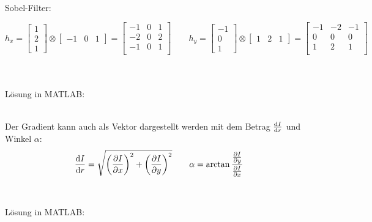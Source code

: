 ~\\
Sobel-Filter:
\begin{scriptsize}\[
	h_x = \left[\begin{matrix} 1 \\ 2 \\ 1\end{matrix}\right] 
	\otimes \left[\begin{matrix} -1 & 0 & 1	\end{matrix}\right] =
	\left[\begin{matrix}
			-1 & 0 & 1\\
			-2 & 0 & 2\\
			-1 & 0 & 1\\
	\end{matrix}\right]	\qquad
	h_y = \left[\begin{matrix} -1 \\ 0 \\ 1\end{matrix}\right] 
	\otimes \left[\begin{matrix} 1 & 2 & 1	\end{matrix}\right] =
	\left[\begin{matrix}
			-1 & -2 & -1\\
			0 & 0 & 0\\
			1 & 2 & 1\\
	\end{matrix}\right]
\]\end{scriptsize}
\\\\
Lösung in MATLAB:
\lstset{language=Matlab}

~\\
Der Gradient kann auch als Vektor dargestellt werden mit dem Betrag $\frac{\mathrm{d} I}{\mathrm{d} r}$ und Winkel $\alpha$:
\[
	\frac{\mathrm{d} I}{\mathrm{d} r} = \sqrt{\left(\frac{\partial I}{\partial x}\right)^2 + \left(\frac{\partial I}{\partial y}\right)^2} \qquad
	\alpha = \arctan \frac{\frac{\partial I}{\partial y}}{\frac{\partial I}{\partial x}}
\]
\\\\
Lösung in MATLAB:
\lstset{language=Matlab}

~\\

